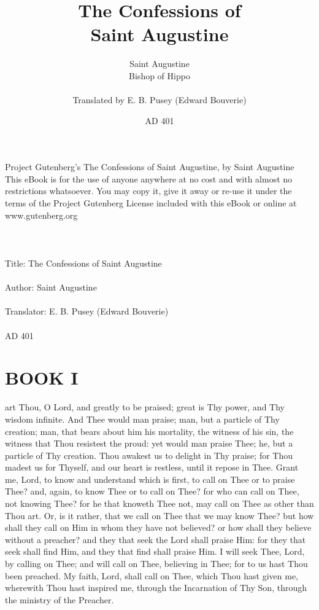 \documentclass[b5paper,openright,12pt,twoside]{book}
\title{The Confessions of \\Saint Augustine}
\author{Saint Augustine\\\small{Bishop of Hippo}\\\\\tiny{Translated by E. B. Pusey (Edward Bouverie)}}
\date{AD 401}
\begin{document}
\pagestyle{empty}
\frontmatter
\maketitle
{}
\noindent
Project Gutenberg's The Confessions of Saint Augustine, by Saint Augustine
\\
\noindent
This eBook is for the use of anyone anywhere at no cost and with
almost no restrictions whatsoever.  You may copy it, give it away or
re-use it under the terms of the Project Gutenberg License included
with this eBook or online at www.gutenberg.org
\\
\\
\\
\\
\noindent
Title: The Confessions of Saint Augustine
\\
\\
\noindent
Author: Saint Augustine
\\
\\
\noindent
Translator: E. B. Pusey (Edward Bouverie)
\\
\\
\noindent
AD 401

\tableofcontents

\chapter{BOOK I}
\setcounter{page}{1}

 art Thou, O Lord, and greatly to be praised; great is Thy power,
and Thy wisdom infinite. And Thee would man praise; man, but a particle
of Thy creation; man, that bears about him his mortality, the witness of
his sin, the witness that Thou resistest the proud: yet would man praise
Thee; he, but a particle of Thy creation. Thou awakest us to delight in
Thy praise; for Thou madest us for Thyself, and our heart is restless,
until it repose in Thee. Grant me, Lord, to know and understand which is
first, to call on Thee or to praise Thee? and, again, to know Thee or
to call on Thee? for who can call on Thee, not knowing Thee? for he that
knoweth Thee not, may call on Thee as other than Thou art. Or, is it
rather, that we call on Thee that we may know Thee? but how shall they
call on Him in whom they have not believed? or how shall they believe
without a preacher? and they that seek the Lord shall praise Him: for
they that seek shall find Him, and they that find shall praise Him.
I will seek Thee, Lord, by calling on Thee; and will call on Thee,
believing in Thee; for to us hast Thou been preached. My faith, Lord,
shall call on Thee, which Thou hast given me, wherewith Thou hast
inspired me, through the Incarnation of Thy Son, through the ministry of
the Preacher.
\end{document}
